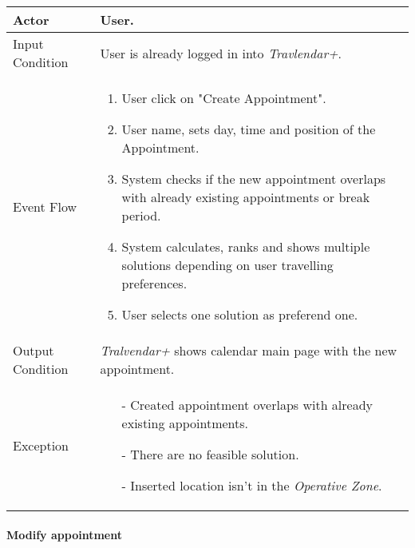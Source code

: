 		\begin{tabular}{| l | p{} | }
			\hline
			\hline
			Actor	&		User. \\
			\hline
			Input Condition		&		User is already logged in into \textit{Travlendar+}. \\
			\hline
			Event Flow		&		\begin{enumerate}
												\item User click on "Create Appointment".
												\item User name, sets day, time and position of the Appointment.
												\item System checks if the new appointment overlaps with already existing appointments or break period.
												\item	 System calculates, ranks and shows multiple solutions depending on user travelling preferences.
												\item User selects one solution as preferend one.
											\end{enumerate} \\
			\hline
			Output Condition		&		\textit{Tralvendar+} shows calendar main page with the new appointment. \\
			\hline		
			Exception		&		\begin{itemize}
											\item[-] Created appointment overlaps with already existing appointments.
											\item[-] There are no feasible solution.
											\item[-] Inserted location isn't in the \textit{Operative Zone}.
										\end{itemize} \\
			\hline
			\hline
		\end{tabular}



	\paragraph{Modify appointment}
	

